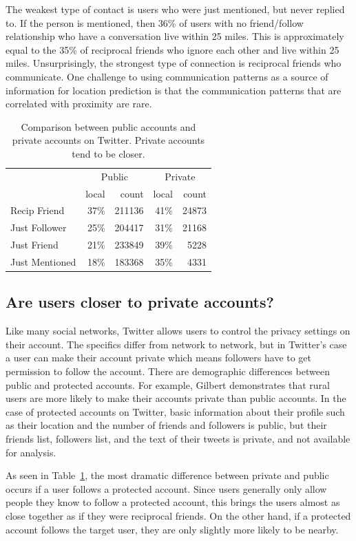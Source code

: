 \documentclass[letterpaper]{article}
\newcommand{\flsec}[1]{\subsection{#1}}
\begin{document}
The weakest type of contact is users who were just mentioned, but never
replied to.
%
If the person is mentioned, then 36\% of users with no
friend/follow relationship who have a conversation live within 25 miles.
%
This is approximately equal to the 35\% of reciprocal friends who ignore each
other and live within 25 miles.
%
Unsurprisingly, the strongest type of connection is reciprocal friends who
communicate.
%
One challenge to using communication patterns as a source of information for
location prediction is that the communication patterns that are correlated
with proximity are rare.

\begin{table}[tbh]
\centering
\begin{tabular}{l | r r | r r}
    & \multicolumn{2}{c}{Public}
    & \multicolumn{2}{|c}{Private} \\
    \cline{2-5}
    &local&count&local&count \\
    \hline
    Recip Friend & 37\%&211136 & 41\%&24873 \\
    Just Follower & 25\%&204417 & 31\%&21168 \\
    Just Friend & 21\%&233849 & 39\%&5228 \\
    Just Mentioned & 18\%&183368 & 35\%&4331 \\
\end{tabular}
\caption{
    Comparison between public accounts and private accounts on Twitter.
    Private accounts tend to be closer.
}
\label{tab:EdgeTypesProt}
\end{table}

\flsec{Are users closer to private accounts?}

Like many social networks, Twitter allows users to control the privacy settings
on their account.
%
The specifics differ from network to network, but in Twitter's case
a user can make their account private which means followers have to get
permission to follow the account.
%
There are demographic differences between public and protected accounts.
%
For example, Gilbert \cite{gilbert2008network} demonstrates that rural users
are more likely to make their accounts private than public accounts.
%
In the case of protected accounts on Twitter, basic information
about their profile such as their location and the number of friends and
followers is public, but their friends list, followers list, and the text of
their tweets is private, and not available for analysis.

As seen in Table~\ref{tab:EdgeTypesProt}, the most dramatic difference between
private and public occurs if a user follows a protected account.
%
Since users generally only allow people they know to follow a protected
account, this brings the users almost as close together as if they were
reciprocal friends.
%
On the other hand, if a protected account follows the target user, they
are only slightly more likely to be nearby.
\end{document}
